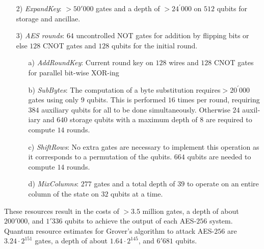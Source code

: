 \documentclass[a4paper,11pt]{article}
\begin{document}
\begin{otherlanguage}{english}
\begin{multicols}{2}
\begin{itemize} [noitemsep, nolistsep]
  \item[2)] \textit{ExpandKey}: $> 50'000$ gates and a depth of $> 24^{\prime}000$ on $512$ qubits for storage and ancillae.
  \vspace{0.1cm}

  \item[3)] \textit{AES rounds}: $64$ uncontrolled NOT gates for addition by flipping bits or else $128$ CNOT gates and $128$ qubits for the initial round.
  \vspace{0.1cm}

  \begin{itemize} [noitemsep, nolistsep]
    \item[a)] \textit{AddRoundKey}: Current round key on $128$ wires and $128$ CNOT gates for parallel bit-wise XOR-ing
    \vspace{0.1cm}

    \item[b)] \textit{SubBytes}: The computation of a byte substitution requires$> 20^{\prime}000$ gates using only $9$ qubits. This is performed $16$ times per round, requiring $384$ auxiliary qubits for all to be done simultaneously. Otherwise $24$ auxiliary and $640$ storage qubits with a maximum depth of $8$ are required to compute $14$ rounds. 
    \vspace{0.1cm}

    \item[c)] \textit{ShiftRows}: No extra gates are necessary to implement this operation as it corresponds to a permutation of the qubits. $664$ qubits are needed to compute $14$ rounds.
    \vspace{0.1cm}

    \item[d)] \textit{MixColumns}: $277$ gates and a total depth of $39$ to operate on an entire column of the state on $32$ qubits at a time.

  \end{itemize}

\end{itemize}

\vspace{0.5cm} 
\noindent
These  resources result in the costs of $> 3.5$ million gates, a depth of about $200'000$, and $1'336$ qubits to achieve the output of each \textsc{AES}-$256$ system. Quantum resource estimates for Grover’s algorithm to attack \textsc{AES}-$256$ are $3.24 \cdot 2^{151}$ gates, a depth of about $1.64 \cdot 2^{145}$, and $6'681$ qubits. \\


\end{multicols}
\end{otherlanguage}
\end{document}
